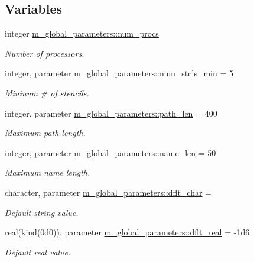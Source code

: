 \subsection*{Variables}
\begin{DoxyCompactItemize}
\item 
integer \hyperlink{namespacem__global__parameters_aafb65952c33f1c363d1040bde29734ea}{m\+\_\+global\+\_\+parameters\+::num\+\_\+procs}
\begin{DoxyCompactList}\small\item\em Number of processors. \end{DoxyCompactList}\item 
integer, parameter \hyperlink{namespacem__global__parameters_a71f091e6074e6c248fd7e03218b89218}{m\+\_\+global\+\_\+parameters\+::num\+\_\+stcls\+\_\+min} = 5
\begin{DoxyCompactList}\small\item\em Mininum \# of stencils. \end{DoxyCompactList}\item 
integer, parameter \hyperlink{namespacem__global__parameters_aa9d578c318044b2f2ec990b5fc0dfab9}{m\+\_\+global\+\_\+parameters\+::path\+\_\+len} = 400
\begin{DoxyCompactList}\small\item\em Maximum path length. \end{DoxyCompactList}\item 
integer, parameter \hyperlink{namespacem__global__parameters_ac8252b115e717c6f1c8595be6f897df7}{m\+\_\+global\+\_\+parameters\+::name\+\_\+len} = 50
\begin{DoxyCompactList}\small\item\em Maximum name length. \end{DoxyCompactList}\item 
character, parameter \hyperlink{namespacem__global__parameters_ae482a2c5436761ab7b01fc973d64002d}{m\+\_\+global\+\_\+parameters\+::dflt\+\_\+char} = \textquotesingle{} \textquotesingle{}
\begin{DoxyCompactList}\small\item\em Default string value. \end{DoxyCompactList}\item 
real(kind(0d0)), parameter \hyperlink{namespacem__global__parameters_a99ba7e33a1870ac89386d376e0d20526}{m\+\_\+global\+\_\+parameters\+::dflt\+\_\+real} = -\/1d6
\begin{DoxyCompactList}\small\item\em Default real value. \end{DoxyCompactList}\item 

\end{DoxyCompactItemize}
